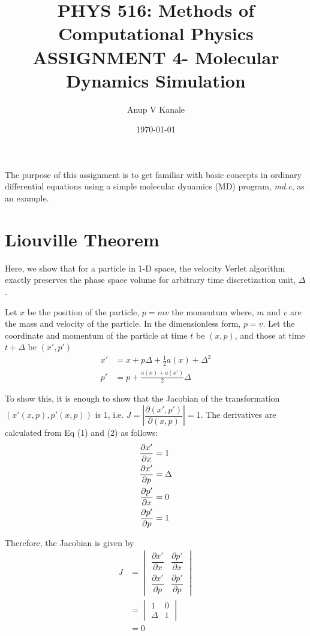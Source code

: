 \documentclass[11pt, oneside]{article}   	%
\title{\vspace{-6ex}\large PHYS 516: Methods of Computational Physics \\
  \normalsize ASSIGNMENT 4- Molecular Dynamics Simulation}
\author{Anup V Kanale}
\date{\vspace{-3ex}\today}							%
\begin{document}
\maketitle
\vspace{-2ex} The purpose of this assignment is to get familiar with basic concepts in ordinary differential equations using a simple molecular dynamics (MD) program, \textit{md.c}, as an example.
\vspace{-2ex}
\section{Liouville Theorem}
\vspace{-2ex} Here, we show that for a particle in 1-D space, the velocity Verlet algorithm exactly preserves the phase space volume for arbitrary time discretization unit, $\Delta$.

 Let $x$ be the position of the particle, $p = mv$ the momentum where, $m$ and $v$ are the mass and velocity of the particle. In the dimensionless form, $p = v$. Let the coordinate and momentum of the particle at time $t$ be $(x, p)$, and those at time $t + \Delta$ be $(x',p')$
 \begin{align}
  x' &= x + p \Delta + \frac{1}{2} a(x) + \Delta^2 \\
  p' &= p + \frac{a(x) + a(x')}{2} \Delta
 \end{align}

To show this, it is enough to show that the Jacobian of the transformation  $(x'(x, p), p'(x, p))$ is $1$, i.e. $ J = \left| \dfrac{\partial (x', p')} {\partial (x, p)} \right| = 1$. The derivatives are calculated from Eq (1) and (2) as follows:
 \begin{align*}
 \pdv{x'}{x} &= 1 \\
 \pdv{x'}{p} &= \Delta \\
 \pdv{p'}{x} &= 0 \\
 \pdv{p'}{p} &= 1
 \end{align*}

Therefore, the Jacobian is given by
 \begin{align}
 J &= \begin{vmatrix}
   \dfrac{\partial x'}{\partial x} & \dfrac{\partial p'} {\partial x} \\[2ex]
   \dfrac{\partial x'}{\partial p} & \dfrac{\partial p'}{\partial p}
   \end{vmatrix} \\[1ex]
   &= \begin{vmatrix}
   1 & 0 \\[1ex]
   \Delta & 1
 \end{vmatrix} \\[1ex]
  &= 0
 \end{align}
\pagebreak
 
\end{document}
